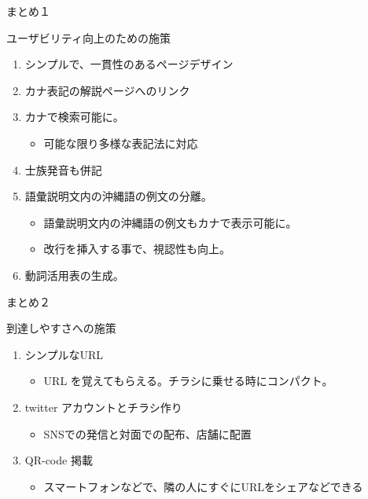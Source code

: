 \documentclass[14pt]{beamer}
\begin{document}
\begin{frame}{まとめ１}
  \begin{block}{ユーザビリティ向上のための施策}
    \begin{enumerate}
      \item シンプルで、一貫性のあるページデザイン
      \item カナ表記の解説ページへのリンク
      \item カナで検索可能に。
        \begin{itemize}
        \item 可能な限り多様な表記法に対応
        \end{itemize}
      \item 士族発音も併記
      \item 語彙説明文内の沖縄語の例文の分離。
      \begin{itemize}
      \item 語彙説明文内の沖縄語の例文もカナで表示可能に。
      \item 改行を挿入する事で、視認性も向上。
      \end{itemize}
    \item 動詞活用表の生成。
    \end{enumerate}
  \end{block}
\end{frame}

\begin{frame}{まとめ２}
  \begin{block}{到達しやすさへの施策}
    \begin{enumerate}
    \item シンプルなURL
      \begin{itemize}
      \item URL を覚えてもらえる。チラシに乗せる時にコンパクト。
      \end{itemize}
    \item twitter アカウントとチラシ作り
      \begin{itemize}
      \item SNSでの発信と対面での配布、店舗に配置
      \end{itemize}
    \item QR-code 掲載
      \begin{itemize}
      \item スマートフォンなどで、隣の人にすぐにURLをシェアなどできる
      \end{itemize}
    \end{enumerate}
  \end{block}
\end{frame}
\end{document}
